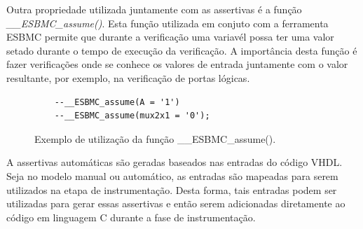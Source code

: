 \par
Outra propriedade utilizada juntamente com as assertivas é a função \textit{\_\_ESBMC\_assume()}. Esta função utilizada em conjuto com a ferramenta ESBMC permite que durante a verificação uma variavél possa ter uma valor setado durante o tempo de execução da verificação. A importância desta função é fazer verificações onde se conhece os valores de entrada juntamente com o valor resultante, por exemplo, na verificação de portas lógicas.

\begin{figure}[H]
\caption{\label{fig:assertiva} Exemplo de utilização da função \_\_ESBMC\_assume().}
	\begin{center}
    \begin{minipage}{0.99\textwidth}
    \begin{lstlisting}       
    --__ESBMC_assume(A = '1')
    --__ESBMC_assume(mux2x1 = '0');
    \end{lstlisting}
    \end{minipage}
	\end{center}
\end{figure}

\par
A assertivas automáticas são geradas baseados nas entradas do código VHDL. Seja no modelo manual ou automático, as entradas são mapeadas para serem utilizados na etapa de instrumentação. Desta forma, tais entradas podem ser utilizadas para gerar essas assertivas e então serem adicionadas diretamente ao código em linguagem C durante a fase de instrumentação. 

